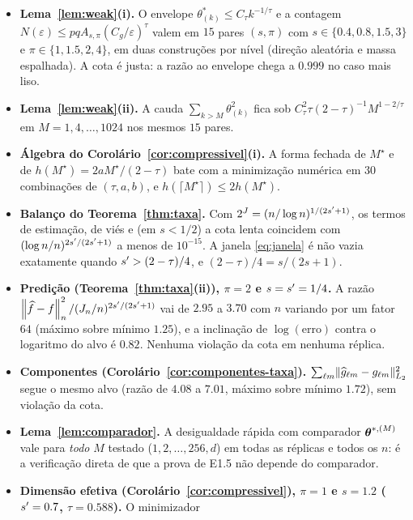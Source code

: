 \documentclass[11pt,a4paper]{article}
\newcommand{\Mstar}{M^{\star}}
\newcommand{\thstarM}[1]{\btheta^{*,(#1)}}
\begin{document}
\begin{itemize}[nosep, leftmargin=*]
  \item \textbf{Lema~\ref{lem:weak}(i).} O envelope
    $\theta^{*}_{(k)} \le C_{\tau}k^{-1/\tau}$ e a contagem
    $N(\varepsilon) \le pqA_{s,\pi}(C_{g}/\varepsilon)^{\tau}$ valem em
    $15$ pares $(s,\pi)$ com $s \in \{0.4,0.8,1.5,3\}$ e
    $\pi \in \{1,1.5,2,4\}$, em duas construções por nível (direção aleatória
    e massa espalhada). A cota é justa: a razão ao envelope chega a $0.999$ no
    caso mais liso.
  \item \textbf{Lema~\ref{lem:weak}(ii).} A cauda
    $\sum_{k>M}\theta_{(k)}^{2}$ fica sob
    $C_{\tau}^{2}\tau(2-\tau)^{-1}M^{1-2/\tau}$ em
    $M = 1,4,\dots,1024$ nos mesmos $15$ pares.
  \item \textbf{Álgebra do Corolário~\ref{cor:compressivel}(i).} A forma
    fechada de $\Mstar$ e de $h(\Mstar) = 2aM^{\star}/(2-\tau)$ bate com a
    minimização numérica em $30$ combinações de $(\tau,a,b)$, e
    $h(\lceil\Mstar\rceil) \le 2h(\Mstar)$.
  \item \textbf{Balanço do Teorema~\ref{thm:taxa}.} Com
    $2^{J} = (n/\log n)^{1/(2s'+1)}$, os termos de estimação, de viés e (em
    $s < 1/2$) a cota lenta coincidem com $(\log n/n)^{2s'/(2s'+1)}$ a
    menos de $10^{-15}$. A janela \eqref{eq:janela} é não vazia exatamente
    quando $s' > (2-\tau)/4$, e $(2-\tau)/4 = s/(2s+1)$.
  \item \textbf{Predição (Teorema~\ref{thm:taxa}(ii)), $\pi = 2$ e
    $s = s' = 1/4$.} A razão
    $\left\lVert \widehat f - f \right\rVert_{n}^{2}/(J_{n}/n)^{2s'/(2s'+1)}$ vai de
    $2.95$ a $3.70$ com $n$ variando por um fator $64$ (máximo sobre mínimo
    $1.25$), e a inclinação de $\log(\text{erro})$ contra o logaritmo do alvo
    é $0.82$. Nenhuma violação da cota em nenhuma réplica.
  \item \textbf{Componentes (Corolário~\ref{cor:componentes-taxa}).}
    $\sum_{\ell m}\lVert\widehat g_{\ell m}-g_{\ell m}\rVert^{2}_{L_{2}}$
    segue o mesmo alvo (razão de $4.08$ a $7.01$, máximo sobre mínimo $1.72$),
    sem violação da cota.
  \item \textbf{Lema~\ref{lem:comparador}.} A desigualdade rápida com
    comparador $\thstarM{M}$ vale para \emph{todo} $M$ testado
    ($1, 2, \dots, 256, d$) em todas as réplicas e todos os $n$: é a
    verificação direta de que a prova de E1.5 não depende do comparador.
  \item \textbf{Dimensão efetiva (Corolário~\ref{cor:compressivel}), $\pi = 1$
    e $s = 1.2$ ($s' = 0.7$, $\tau = 0.588$).} O minimizador

\end{itemize}
\end{document}
